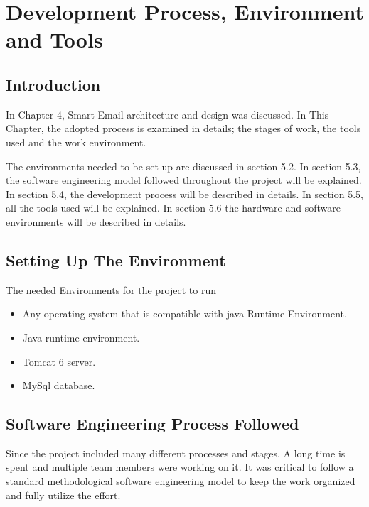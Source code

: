 
\chapter{Development Process, Environment and Tools} %

\label{Chapter5} %


\section{Introduction}
In Chapter 4, Smart Email architecture and design was discussed. In This Chapter, 
the adopted process is examined in details; the stages of work, the tools used 
and the work environment.

The environments needed to be set up are discussed in section 5.2. In section 5.3, 
the software engineering model followed throughout the project will be explained. 
In section 5.4, the development process will be described in details. In section 5.5, 
all the tools used will be explained. In section 5.6 the hardware and software 
environments will be described in details.
\section{Setting Up The Environment}
The needed Environments for the project to run
\begin{itemize}
\item Any operating system that is compatible with java Runtime Environment.
\item Java runtime environment.
\item Tomcat 6 server.
\item MySql database.
\end{itemize}

\section{Software Engineering Process Followed}
Since the project included many different processes and stages. A long time is spent and multiple team members were working on it. It was critical to follow a standard methodological software engineering model to keep the work organized and fully utilize the effort.


